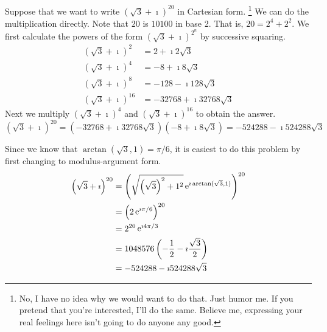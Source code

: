 \begin{Example}
  Suppose that we want to write $\left( \sqrt{3} + \imath \right)^{20}$ 
  in Cartesian form.%
  \footnote{No, I have no idea why we would want to do that.  Just humor
    me.  If you pretend that you're interested, I'll do the same.  Believe
    me, expressing your real feelings here isn't going to do anyone any good.}
  We can do the multiplication directly.  Note that $20$ is $10100$ in base 2.
  That is, $20 = 2^4 + 2^2$.  We first calculate the powers of the form
  $\left( \sqrt{3} + \imath \right)^{2^n}$ by successive squaring.
  \begin{align*}
    \left( \sqrt{3} + \imath \right)^2 &= 2 + \imath 2 \sqrt{3} \\
    \left( \sqrt{3} + \imath \right)^4 &= -8 + \imath 8 \sqrt{3} \\
    \left( \sqrt{3} + \imath \right)^8 &= -128 - \imath 128 \sqrt{3} \\
    \left( \sqrt{3} + \imath \right)^{16} &= -32768 + \imath 32768 \sqrt{3} 
  \end{align*}
  Next we multiply $\left( \sqrt{3} + \imath \right)^4$ and 
  $\left( \sqrt{3} + \imath \right)^{16}$ to obtain the answer.
  \[
  \left( \sqrt{3} + \imath \right)^{20} 
  = \left( -32768 + \imath 32768 \sqrt{3} \right) 
  \left( - 8 + \imath 8 \sqrt{3} \right)
  = - 524288 - \imath 524288 \sqrt{3}
  \]

  Since we know that $\arctan\left( \sqrt{3},1 \right) = \pi/6$,
  it is easiest to do this problem by first changing to modulus-argument form.
  \begin{align*}
    \left( \sqrt{3} + \imath \right)^{20} 
    &= \left( \sqrt{ \left( \sqrt{3} \right)^2 + 1^2} 
      \mathop{\mathrm{e}}\nolimits^{\imath \arctan(\sqrt{3},1)} \right)^{20} 
    \\
    &= \left( 2 \mathop{\mathrm{e}}\nolimits^{\imath \pi / 6} \right)^{20} 
    \\
    &= 2^{20} \mathop{\mathrm{e}}\nolimits^{\imath 4 \pi / 3} 
    \\
    &= 1048576 \left( - \frac{1}{2} - \imath \frac{\sqrt{3}}{2} \right) 
    \\
    &= - 524288 - \imath 524288 \sqrt{3}
  \end{align*}
\end{Example}








